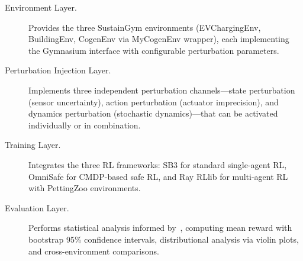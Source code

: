 \begin{description}
    \item[Environment Layer.] Provides the three SustainGym environments (EVChargingEnv, BuildingEnv, CogenEnv via MyCogenEnv wrapper), each implementing the Gymnasium interface with configurable perturbation parameters.

    \item[Perturbation Injection Layer.] Implements three independent perturbation channels---state perturbation (sensor uncertainty), action perturbation (actuator imprecision), and dynamics perturbation (stochastic dynamics)---that can be activated individually or in combination.

    \item[Training Layer.] Integrates the three RL frameworks: SB3 for standard single-agent RL, OmniSafe for CMDP-based safe RL, and Ray RLlib for multi-agent RL with PettingZoo environments.

    \item[Evaluation Layer.] Performs statistical analysis informed by~\citet{agarwal2021deep}, computing mean reward with bootstrap 95\% confidence intervals, distributional analysis via violin plots, and cross-environment comparisons.
\end{description}

